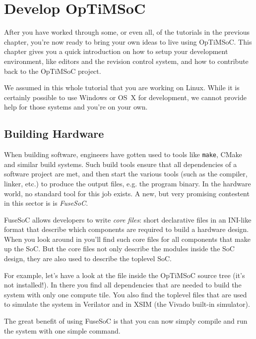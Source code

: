 \chapter{Develop OpTiMSoC}
\label{chap:develop-optimsoc}

After you have worked through some, or even all, of the tutorials in the
previous chapter, you're now ready to bring your own ideas to live using
OpTiMSoC. This chapter gives you a quick introduction on how to setup your
development environment, like editors and the revision control system, and how
to contribute back to the OpTiMSoC project.

We assumed in this whole tutorial that you are working on Linux. While it is
certainly possible to use Windows or OS~X for development, we cannot provide
help for those systems and you're on your own.

\section{Building Hardware}
When building software, engineers have gotten used to tools like \verb|make|, CMake and similar build systems.
Such build tools ensure that all dependencies of a software project are met, and then start the various tools (such as the compiler, linker, etc.) to produce the output files, e.g. the program binary.
In the hardware world, no standard tool for this job exists.
A new, but very promising contestent in this sector is is \emph{FuseSoC}.

FuseSoC allows developers to write \emph{core files}: short declarative files in an INI-like format that describe which components are required to build a hardware design.
When you look around in  you'll find such core files for all components that make up the SoC.
But the core files not only describe the modules inside the SoC design, they are also used to describe the toplevel SoC.

For example, let's have a look at the file  inside the OpTiMSoC source tree (it's not installed!).
In there you find all dependencies that are needed to build the system with only one compute tile.
You also find the toplevel files that are used to simulate the system in Verilator and in XSIM (the Vivado built-in simulator).

The great benefit of using FuseSoC is that you can now simply compile and run the system with one simple command.

